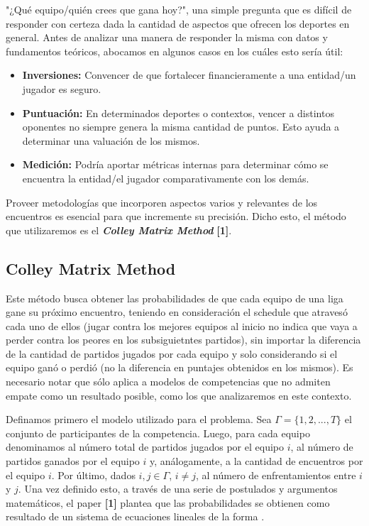 "¿Qu\'e equipo/qui\'en crees que gana hoy?", una simple pregunta que es dif\'icil de responder con certeza dada la cantidad de aspectos que ofrecen los deportes en general. Antes de analizar una manera de responder la misma con datos y fundamentos te\'oricos, abocamos en algunos casos en los cuáles esto ser\'ia \'util:

\begin{itemize}
\item \textbf{Inversiones:} Convencer de que fortalecer financieramente a una entidad/un jugador es seguro.
\item \textbf{Puntuaci\'on:} En determinados deportes o contextos, vencer a distintos oponentes no siempre genera la misma cantidad de puntos. Esto ayuda a determinar una valuaci\'on de los mismos.
\item \textbf{Medici\'on:} Podr\'ia aportar m\'etricas internas para determinar c\'omo se encuentra la entidad/el jugador comparativamente con los dem\'as.
\end{itemize}

Proveer metodolog\'ias que incorporen aspectos varios y relevantes de los encuentros es esencial para que incremente su precisión. Dicho esto, el m\'etodo que utilizaremos es el \textbf{\textit{Colley Matrix Method}} \textbf{[1]}.

\subsection{Colley Matrix Method}

Este m\'etodo busca obtener las probabilidades de que cada equipo de una liga gane su pr\'oximo encuentro, teniendo en consideraci\'on el schedule que atraves\'o cada uno de ellos (jugar contra los mejores equipos al inicio no indica que vaya a perder contra los peores en los subsiguietntes partidos), sin importar la diferencia de la cantidad de partidos jugados por cada equipo y solo considerando si el equipo gan\'o o perdi\'o (no la diferencia en puntajes obtenidos en los mismos). Es necesario notar que s\'olo aplica a modelos de competencias que no admiten empate como un resultado posible, como los que analizaremos en este contexto.

Definamos primero el modelo utilizado para el problema. Sea $\Gamma = \{1,2,...,T\}$ el conjunto de participantes de la competencia. Luego, para cada equipo  denominamos  al n\'umero total de partidos jugados por el equipo $i$,  al n\'umero de partidos ganados por el equipo $i$ y, an\'alogamente,  a la cantidad de encuentros por el equipo $i$. Por \'ultimo, dados $i, j \in \Gamma$, $i \neq j$,  al n\'umero de enfrentamientos entre $i$ y $j$. Una vez definido esto, a través de una serie de postulados y argumentos matemáticos, el paper \textbf{[1]} plantea que las probabilidades se obtienen como resultado de un sistema de ecuaciones lineales de la forma . \\

